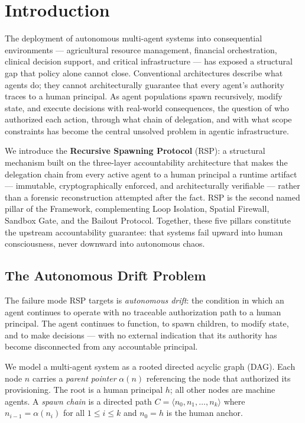 \section{Introduction}
\label{sec:rs-intro}

The deployment of autonomous multi-agent systems into consequential environments — agricultural resource management, financial orchestration, clinical decision support, and critical infrastructure — has exposed a structural gap that policy alone cannot close. Conventional architectures describe what agents do; they cannot architecturally guarantee that every agent's authority traces to a human principal. As agent populations spawn recursively, modify state, and execute decisions with real-world consequences, the question of who authorized each action, through what chain of delegation, and with what scope constraints has become the central unsolved problem in agentic infrastructure.

We introduce the \textbf{Recursive Spawning Protocol} (RSP): a structural mechanism built on the \bxthree{} three-layer accountability architecture that makes the delegation chain from every active agent to a human principal a runtime artifact — immutable, cryptographically enforced, and architecturally verifiable — rather than a forensic reconstruction attempted after the fact. RSP is the second named pillar of the \bxthree{} Framework, complementing Loop Isolation, Spatial Firewall, Sandbox Gate, and the Bailout Protocol. Together, these five pillars constitute the upstream accountability guarantee: that \bxthree{} systems fail upward into human consciousness, never downward into autonomous chaos.

\subsection{The Autonomous Drift Problem}
\label{sec:rs-intro-drift}

The failure mode RSP targets is \emph{autonomous drift}: the condition in which an agent continues to operate with no traceable authorization path to a human principal. The agent continues to function, to spawn children, to modify state, and to make decisions — with no external indication that its authority has become disconnected from any accountable principal.

We model a multi-agent system as a rooted directed acyclic graph (DAG). Each node $n$ carries a \emph{parent pointer} $\alpha(n)$ referencing the node that authorized its provisioning. The root is a human principal $h$; all other nodes are machine agents. A \emph{spawn chain} is a directed path $C = \langle n_0, n_1, \ldots, n_k \rangle$ where $n_{i-1} = \alpha(n_i)$ for all $1 \leq i \leq k$ and $n_0 = h$ is the human anchor.

